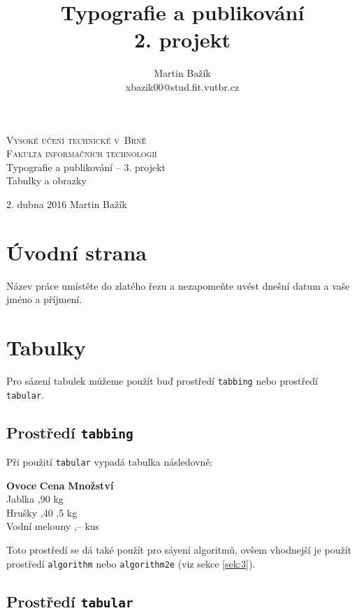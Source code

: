 \documentclass[a4paper,11pt]{article}
\author{Martin Bažík \\ xbazik00@stud.fit.vutbr.cz}
\title{Typografie a publikování \\ 2. projekt}
\date{}
\begin{document}
	\begin{titlepage}
		\begin{center}
			\textsc{\Huge Vysoké učení technické v~Brně}\\
			\textsc{\huge Fakulta informačních technologií}
			\\{\LARGE Typografie a publikování -- 3. projekt\\
				\Huge Tabulky a obrazky }
		\end{center}
		{\Large 2. dubna 2016 \hfill Martin Bažík}	
	\end{titlepage}
	\newpage	
	
	\section{Úvodní strana}
	Název práce umístěte do zlatého řezu a nezapomeňte uvést dnešní datum a vaše jméno a příjmení.
	
	\section{Tabulky}
	Pro sázení tabulek můžeme použít buď prostředí \texttt{tabbing} nebo prostředí \texttt{tabular}.
	
	\subsection{Prostředí \texttt{tabbing}}
	Při použití \texttt{tabular} vypadá tabulka následovně:
	
	\begin{tabbing}
		\textbf{Ovoce} \qquad\qquad \= \textbf{Cena} \quad \= \textbf{Množství} \\
		Jablka ,90  kg \\
		Hrušky ,40 ,5 kg \\
		Vodní melouny ,--  kus  
	\end{tabbing}
	
	Toto prostředí se dá také použít pro sáyení algoritmů, ovšem vhodnejší je použít prostředí \texttt{algorithm}
	nebo \texttt{algorithm2e} (viz sekce \ref{sek:3}).
	
	\subsection{Prostředí \texttt{tabular}}
	
\end{document}
